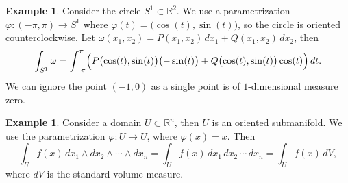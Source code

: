 \documentclass[12pt,openany]{book}
\newcommand{\R}{{\mathbb{R}}}
\theoremstyle{plain}
\theoremstyle{remark}
\theoremstyle{definition}
\theoremstyle{exercise}
\theoremstyle{example}
\newtheorem{example}[thm]{Example}
\begin{document}
\begin{example} \label{example:diffformscircleint}
Consider the circle $S^1 \subset
\R^2$.  We use a parametrization $\varphi \colon (-\pi,\pi) \to S^1$
where $\varphi(t) = \bigl(\cos(t),\sin(t)\bigr)$, so the circle is oriented
counterclockwise.
Let $\omega(x_1,x_2) = P(x_1,x_2) \, dx_1 + Q(x_1,x_2) \, dx_2$, then
\begin{equation*}
\int_{S^1} \omega =
\int_{-\pi}^{\pi} 
\Bigl(
P\bigl(\cos(t),\sin(t)\bigr) \bigl(-\sin(t)\bigr)  +
Q\bigl(\cos(t),\sin(t)\bigr) \cos(t) \Bigr) \, dt .
\end{equation*}
We can ignore the point $(-1,0)$ as a single point is of $1$-dimensional
measure zero.
\end{example}

\begin{example}
Consider a domain $U \subset \R^n$, then $U$ is an oriented submanifold.
We use the parametrization $\varphi \colon U \to U$, where $\varphi(x) =
x$.  Then
\begin{equation*}
\int_U f(x) \, dx_1 \wedge dx_2 \wedge \cdots \wedge dx_n
=
\int_U f(x) \, dx_1 \, dx_2 \,  \cdots \, dx_n
=
\int_U f(x) \, dV ,
\end{equation*}
where $dV$ is the standard volume measure.
\end{example}
\end{document}
